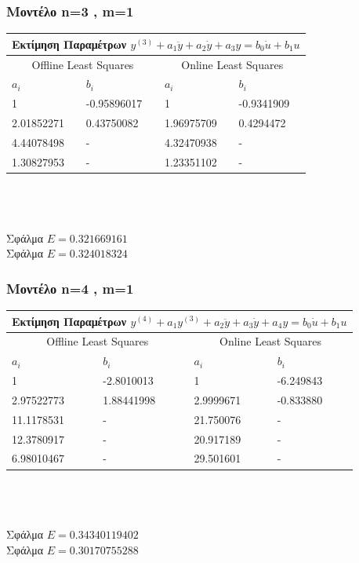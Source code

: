\documentclass[12pt]{article}
\begin{document}
\subsubsection{Μοντέλο n=3 , m=1}
\begin{tabular}{ |p{2.5cm}|p{2.5cm}||p{2.5cm}|p{2.5cm}| }
\hline
\multicolumn{4}{|c|}{ Εκτίμηση Παραμέτρων  $y^{(3)}+a_1\ddot{y}+a_2\dot{y}+a_3 y=b_{0}\dot{u}+b_{1}u$}\\
\hline
\multicolumn{2}{|c||}{Offline Least Squares}&
\multicolumn{2}{|c|}{Online Least Squares }
\\
\hline
$ a_{i}$ & $b_i$ &$ a_{i}$ & $b_i$  \\
\hline
  1         & -0.95896017  &     1       & -0.9341909\\
2.01852271  &  0.43750082  & 1.96975709  &  0.4294472\\
4.44078498  & -            & 4.32470938  & - \\
1.30827953  & -            & 1.23351102  & - \\
\hline
\end{tabular}
\\ \\\\
Σφάλμα $E=0.321669161$\\
Σφάλμα $E=0.324018324$
\subsubsection{Μοντέλο n=4 , m=1}
\begin{tabular}{ |p{2.5cm}|p{2.5cm}||p{2.5cm}|p{2.5cm}| }
\hline
\multicolumn{4}{|c|}{ Εκτίμηση Παραμέτρων  $y^{(4)}+a_1y^{(3)}+a_2\ddot{y}+a_3\dot{y}+a_4 y= b_{0}\dot{u}+b_{1}u$}\\
\hline
\multicolumn{2}{|c||}{Offline Least Squares}&
\multicolumn{2}{|c|}{Online Least Squares }
\\
\hline
$ a_{i}$ & $b_i$ &$ a_{i}$ & $b_i$  \\
\hline
 1          & -2.8010013   &     1      &  -6.249843 \\
2.97522773  & 1.88441998   & 2.9999671  &  -0.833880 \\
11.1178531  & -            & 21.750076  & - \\
12.3780917  & -            & 20.917189  & - \\
6.98010467  & -            & 29.501601  & - \\
\hline
\end{tabular}
\\ \\\\
Σφάλμα $E=0.34340119402$\\
Σφάλμα $E=0.30170755288$
\end{document}
